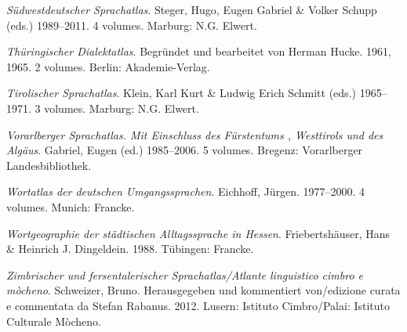 \begin{description}[font=\normalfont]
\item[SSA:] \textit{Südwestdeutscher Sprachatlas}. Steger, Hugo, Eugen Gabriel \& Volker Schupp (eds.) 1989--2011. 4 volumes.  Marburg: N.G. Elwert.
\item[ThürDA:] \textit{Thüringischer Dialektatlas}. Begründet und bearbeitet von Herman Hucke. 1961, 1965. 2 volumes. Berlin: Akademie-Verlag.
\item[TSA:]  \textit{Tirolischer Sprachatlas}. Klein, Karl Kurt \& Ludwig Erich Schmitt (eds.) 1965--1971. 3 volumes. Marburg: N.G. Elwert.
\item[VALTS:]  \textit{Vorarlberger Sprachatlas. Mit Einschluss des Fürstentums , Westtirols und des Algäus}. Gabriel, Eugen (ed.) 1985--2006. 5 volumes. Bregenz: Vorarlberger Landesbibliothek.
\item[WDU:] \textit{Wortatlas der deutschen Umgangssprachen}. Eichhoff, Jürgen. 1977--2000. 4 volumes. Munich: Francke.
\item[WSAH:] \textit{Wortgeographie der städtischen Alltagssprache in Hessen}. Friebertshäuser, Hans \& Heinrich J. Dingeldein. 1988. Tübingen: Francke.
\item[ZFSA:] \textit{Zimbrischer und fersentalerischer Sprachatlas/Atlante linguistico cimbro e mòcheno}. Schweizer, Bruno. Herausgegeben und kommentiert von/edizione curata e commentata da Stefan Rabanus. 2012. Lusern: Istituto Cimbro/Palai: Istituto Culturale Mòcheno.
\end{description}
